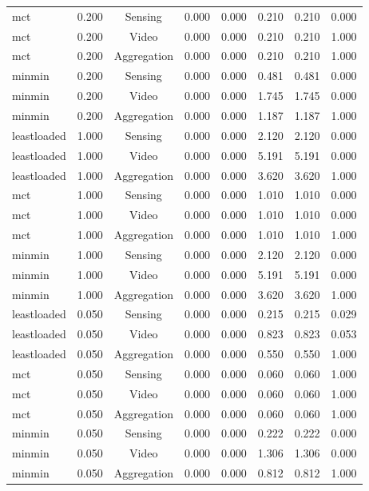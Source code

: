 \begin{table}
\begin{tabular}{lccccccc}
mct & 0.200 & Sensing & 0.000 & 0.000 & 0.210 & 0.210 & 0.000 \\
mct & 0.200 & Video & 0.000 & 0.000 & 0.210 & 0.210 & 1.000 \\
mct & 0.200 & Aggregation & 0.000 & 0.000 & 0.210 & 0.210 & 1.000 \\
minmin & 0.200 & Sensing & 0.000 & 0.000 & 0.481 & 0.481 & 0.000 \\
minmin & 0.200 & Video & 0.000 & 0.000 & 1.745 & 1.745 & 0.000 \\
minmin & 0.200 & Aggregation & 0.000 & 0.000 & 1.187 & 1.187 & 1.000 \\
leastloaded & 1.000 & Sensing & 0.000 & 0.000 & 2.120 & 2.120 & 0.000 \\
leastloaded & 1.000 & Video & 0.000 & 0.000 & 5.191 & 5.191 & 0.000 \\
leastloaded & 1.000 & Aggregation & 0.000 & 0.000 & 3.620 & 3.620 & 1.000 \\
mct & 1.000 & Sensing & 0.000 & 0.000 & 1.010 & 1.010 & 0.000 \\
mct & 1.000 & Video & 0.000 & 0.000 & 1.010 & 1.010 & 0.000 \\
mct & 1.000 & Aggregation & 0.000 & 0.000 & 1.010 & 1.010 & 1.000 \\
minmin & 1.000 & Sensing & 0.000 & 0.000 & 2.120 & 2.120 & 0.000 \\
minmin & 1.000 & Video & 0.000 & 0.000 & 5.191 & 5.191 & 0.000 \\
minmin & 1.000 & Aggregation & 0.000 & 0.000 & 3.620 & 3.620 & 1.000 \\
leastloaded & 0.050 & Sensing & 0.000 & 0.000 & 0.215 & 0.215 & 0.029 \\
leastloaded & 0.050 & Video & 0.000 & 0.000 & 0.823 & 0.823 & 0.053 \\
leastloaded & 0.050 & Aggregation & 0.000 & 0.000 & 0.550 & 0.550 & 1.000 \\
mct & 0.050 & Sensing & 0.000 & 0.000 & 0.060 & 0.060 & 1.000 \\
mct & 0.050 & Video & 0.000 & 0.000 & 0.060 & 0.060 & 1.000 \\
mct & 0.050 & Aggregation & 0.000 & 0.000 & 0.060 & 0.060 & 1.000 \\
minmin & 0.050 & Sensing & 0.000 & 0.000 & 0.222 & 0.222 & 0.000 \\
minmin & 0.050 & Video & 0.000 & 0.000 & 1.306 & 1.306 & 0.000 \\
minmin & 0.050 & Aggregation & 0.000 & 0.000 & 0.812 & 0.812 & 1.000 \\

\end{tabular}
\end{table}
